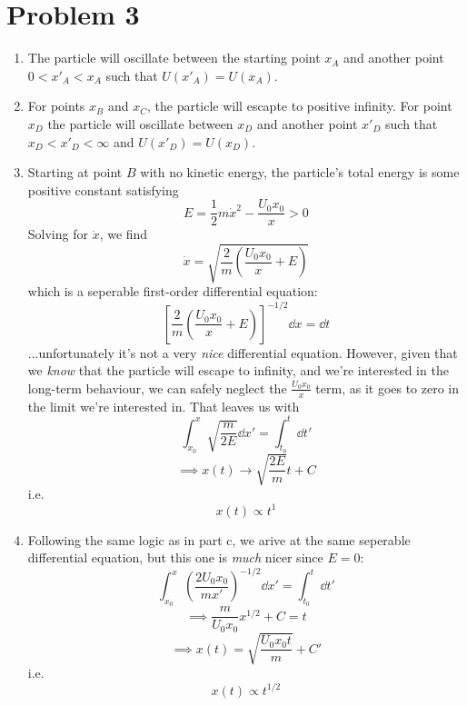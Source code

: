 \documentclass[12pt]{article}
\newcommand{\cint}[2]{\int_{#1}^{#2}}
\begin{document}
\section*{Problem 3}
\begin{enumerate}[label=(\alph*)]
    \item The particle will oscillate between the starting point $x_A$ and another point $0<x'_A<x_A$ such that $U(x'_A) = U(x_A)$.
    \item For points $x_B$ and $x_C$, the particle will escapte to positive infinity. For point $x_D$ the particle will oscillate between $x_D$ and another point $x'_D$ such that $x_D<x'_D<\infty$ and $U(x'_D) = U(x_D)$.
    \item Starting at point $B$ with no kinetic energy, the particle's total energy is some positive constant satisfying
    \[ E = \frac{1}{2}m\dot{x}^2 - \frac{U_0x_0}{x} > 0 \]
    Solving for $\dot{x}$, we find
    \[ \dot{x} = \sqrt{\frac{2}{m}\left(\frac{U_0x_0}{x} + E\right)} \]
    which is a seperable first-order differential equation:
    \[ \left[\frac{2}{m}\left(\frac{U_0x_0}{x} + E\right)\right]^{-1/2} \dd x = \dd t \]
    ...unfortunately it's not a very \textit{nice} differential equation. However, given that we \textit{know} that the particle will escape to infinity, and we're interested in the long-term behaviour, we can safely neglect the $\frac{U_0x_0}{x}$ term, as it goes to zero in the limit we're interested in. That leaves us with
    \[ \cint{x_0}{x}\sqrt{\frac{m}{2E}}\dd x' = \cint{t_0}{t}\dd t' \]
    \[ \implies x(t) \to \sqrt{\frac{2E}{m}}t + C \]
    i.e.
    \[ \boxed{x(t) \propto t^1} \]

    \item Following the same logic as in part c, we arive at the same seperable differential equation, but this one is \textit{much} nicer since $E=0$:
    \[ \cint{x_0}{x}\left(\frac{2U_0x_0}{mx'}\right)^{-1/2}\dd x' = \cint{t_0}{t}\dd t' \]
    \[ \implies \frac{m}{U_0x_0}x^{1/2} + C = t \]
    \[ \implies x(t) = \sqrt{\frac{U_0x_0t}{m}} + C' \]
    i.e.
    \[ x(t) \propto t^{1/2} \]
\end{enumerate}
\end{document}
